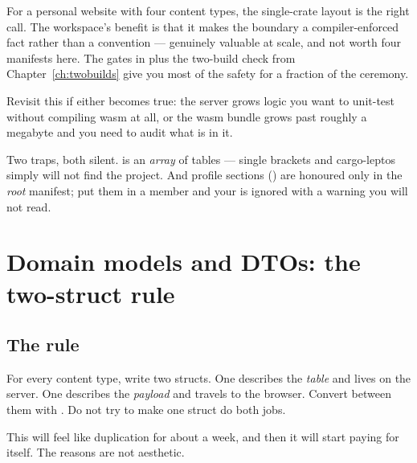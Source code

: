 \begin{pattern}
For a personal website with four content types, the single-crate layout is the right call. The
workspace's benefit is that it makes the boundary a compiler-enforced fact rather than a
convention --- genuinely valuable at scale, and not worth four manifests here. The gates in
 plus the two-build check from Chapter~\ref{ch:twobuilds} give you most of the safety
for a fraction of the ceremony.

Revisit this if either becomes true: the server grows logic you want to unit-test without
compiling wasm at all, or the wasm bundle grows past roughly a megabyte and you need to audit what
is in it.
\end{pattern}

\begin{pitfall}
Two traps, both silent.  is an \emph{array} of tables ---
single brackets and cargo-leptos simply will not find the project. And profile sections
() are honoured only in the \emph{root} manifest; put them in a
member and your  is ignored with a warning you will not read.
\end{pitfall}

\chapter{Domain models and DTOs: the two-struct rule}
\label{ch:dto}

\section{The rule}

\begin{keyidea}
For every content type, write two structs. One describes the \emph{table} and lives on the server.
One describes the \emph{payload} and travels to the browser. Convert between them with
. Do not try to make one struct do both jobs.
\end{keyidea}

This will feel like duplication for about a week, and then it will start paying for itself. The
reasons are not aesthetic.

